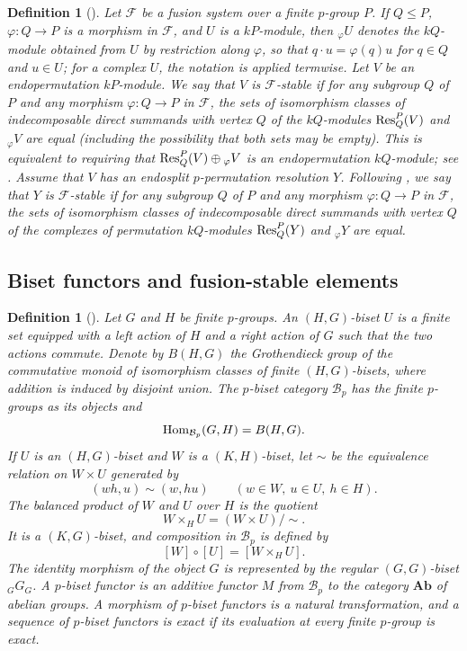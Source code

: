 \documentclass[preprint,12pt,3p]{elsarticle}
\newtheorem{definition}[theorem]{Definition}%
\def\Res{{\rm Res}}
\def\Hom{{\rm Hom}}
\def\F{\mathcal{F}}
\begin{document}
\begin{definition}[{\cite[Definitions 9.9.1, 9.9.2]{Lin18b}}]\label{def:fusion-stability}
{\rm Let $\F$ be a fusion system over a finite $p$-group $P$. If $Q\leq P$, $\varphi:Q\to P$ is a morphism in $\F$, and $U$ is a $kP$-module, then ${}_\varphi U$ denotes the $kQ$-module obtained from $U$ by restriction along $\varphi$, so that $q\cdot u=\varphi(q)u$ for $q\in Q$ and $u\in U$; for a complex $U$, the notation is applied termwise. Let $V$ be an endopermutation $kP$-module. We say that $V$ is {\it $\F$-stable} if for any subgroup $Q$ of $P$ and any morphism $\varphi:Q\to P$ in $\F$, the sets of isomorphism classes of indecomposable direct summands with vertex $Q$ of the $kQ$-modules ${\rm Res}_Q^P(V)$ and ${}_\varphi V$ are equal (including the possibility that both sets may be empty). This is equivalent to requiring that ${\rm Res}_Q^P(V)\oplus {}_\varphi V$ is an endopermutation $kQ$-module; see \cite[Corollary 6.12]{Dade}. Assume that $V$ has an endosplit $p$-permutation resolution $Y$. Following \cite[Definition 9.9.2]{Lin18b}, we say that $Y$ is {\it $\F$-stable} if for any subgroup $Q$ of $P$ and any morphism $\varphi:Q\to P$ in $\F$, the sets of isomorphism classes of indecomposable direct summands with vertex $Q$ of the complexes of permutation $kQ$-modules $\Res_Q^P(Y)$ and ${}_\varphi Y$ are equal.}
\end{definition}

\subsection{Biset functors and fusion-stable elements}



\begin{definition}[{\cite[Chapters 2 and 3]{Bouc10}}]\label{def:p-biset-functor}
{\rm Let $G$ and $H$ be finite $p$-groups. An $(H,G)$-biset $U$ is a finite set equipped with a left action of $H$ and a right action of $G$ such that the two actions commute. Denote by $B(H,G)$ the Grothendieck group of the commutative monoid of isomorphism classes of finite $(H,G)$-bisets, where addition is induced by disjoint union. The {\it $p$-biset category} $\mathcal{B}_p$ has the finite $p$-groups as its objects and
$$
 \Hom_{\mathcal{B}_p}(G,H)=B(H,G).
$$
If $U$ is an $(H,G)$-biset and $W$ is a $(K,H)$-biset, let $\sim$ be the equivalence relation on $W\times U$ generated by
$$
 (wh,u)\sim(w,hu)\qquad(w\in W,\ u\in U,\ h\in H).
$$
The {\it balanced product} of $W$ and $U$ over $H$ is the quotient
$$
 W\times_H U=(W\times U)/{\sim}.
$$
It is a $(K,G)$-biset, and composition in $\mathcal{B}_p$ is defined by
$$
 [W]\circ[U]=[W\times_H U].
$$
The identity morphism of the object $G$ is represented by the regular $(G,G)$-biset ${}_G G_G$. A {\it $p$-biset functor} is an additive functor $M$ from $\mathcal{B}_p$ to the category  $\mathbf{Ab}$ of abelian groups. A morphism of $p$-biset functors is a natural transformation, and a sequence of $p$-biset functors is {\it exact} if its evaluation at every finite $p$-group is exact.}
\end{definition}
\end{document}
